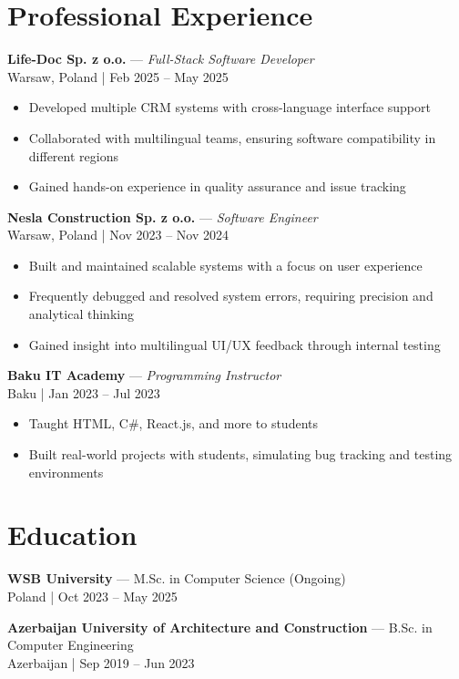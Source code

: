 \documentclass[11pt,a4paper]{article}
\begin{document}
\section*{Professional Experience}

\textbf{Life-Doc Sp. z o.o.} — \textit{Full-Stack Software Developer} \\
Warsaw, Poland | Feb 2025 – May 2025
\begin{itemize}[leftmargin=*]
    \item Developed multiple CRM systems with cross-language interface support
    \item Collaborated with multilingual teams, ensuring software compatibility in different regions
    \item Gained hands-on experience in quality assurance and issue tracking
\end{itemize}

\textbf{Nesla Construction Sp. z o.o.} — \textit{Software Engineer} \\
Warsaw, Poland | Nov 2023 – Nov 2024
\begin{itemize}[leftmargin=*]
    \item Built and maintained scalable systems with a focus on user experience
    \item Frequently debugged and resolved system errors, requiring precision and analytical thinking
    \item Gained insight into multilingual UI/UX feedback through internal testing
\end{itemize}


\textbf{Baku IT Academy} — \textit{Programming Instructor} \\
Baku | Jan 2023 – Jul 2023
\begin{itemize}[leftmargin=*]
    \item Taught HTML, C\#, React.js, and more to students
    \item Built real-world projects with students, simulating bug tracking and testing environments
\end{itemize}



\section*{Education}

\textbf{WSB University} — M.Sc. in Computer Science (Ongoing) \\
Poland | Oct 2023 – May 2025

\textbf{Azerbaijan University of Architecture and Construction} — B.Sc. in Computer Engineering \\
Azerbaijan | Sep 2019 – Jun 2023
\end{document}
